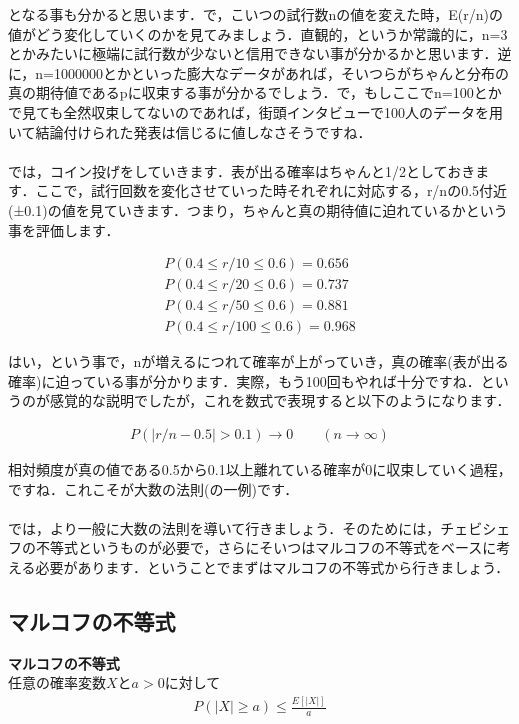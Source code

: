 \documentclass[11pt,a4paper]{ujreport} 	%
\begin{document}
となる事も分かると思います．で，こいつの試行数nの値を変えた時，E(r/n)の値がどう変化していくのかを見てみましょう．直観的，というか常識的に，n=3とかみたいに極端に試行数が少ないと信用できない事が分かるかと思います．逆に，n=1000000とかといった膨大なデータがあれば，そいつらがちゃんと分布の真の期待値であるpに収束する事が分かるでしょう．で，もしここでn=100とかで見ても全然収束してないのであれば，街頭インタビューで100人のデータを用いて結論付けられた発表は信じるに値しなさそうですね．\\
\\

では，コイン投げをしていきます．表が出る確率はちゃんと1/2としておきます．ここで，試行回数を変化させていった時それぞれに対応する，r/nの0.5付近(±0.1)の値を見ていきます．つまり，ちゃんと真の期待値に迫れているかという事を評価します．

\begin{align}
  P(0.4 \leq r/10 \leq 0.6) = 0.656\\
  P(0.4 \leq r/20 \leq 0.6) = 0.737\\
  P(0.4 \leq r/50 \leq 0.6) = 0.881\\
  P(0.4 \leq r/100 \leq 0.6) = 0.968
\end{align}

はい，という事で，nが増えるにつれて確率が上がっていき，真の確率(表が出る確率)に迫っている事が分かります．実際，もう100回もやれば十分ですね．というのが感覚的な説明でしたが，これを数式で表現すると以下のようになります．

\begin{align}
  P(|r/n -0.5| > 0.1) \longrightarrow 0\qquad(n\rightarrow\infty)
\end{align}

相対頻度が真の値である0.5から0.1以上離れている確率が0に収束していく過程，ですね．これこそが大数の法則(の一例)です．\\\\

では，より一般に大数の法則を導いて行きましょう．そのためには，チェビシェフの不等式というものが必要で，さらにそいつはマルコフの不等式をベースに考える必要があります．ということでまずはマルコフの不等式から行きましょう．

\subsection{マルコフの不等式}

\begin{screen}
  \textbf{マルコフの不等式}\\
  任意の確率変数$X$と$a>0$に対して
  \begin{align}
    P(|X| \geq a) \leq \frac{E[|X|]}{a}
  \end{align}
\end{screen}
\end{document}
